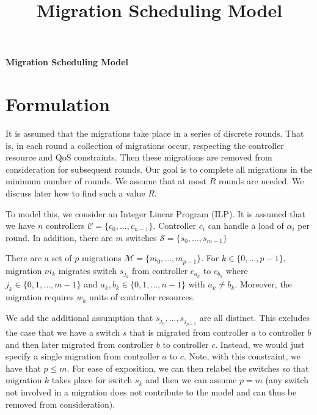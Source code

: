 \documentclass[letterpaper,12pt,titlepage,oneside,final]{article}
\title{Migration Scheduling Model}
\let\oldcenter\center
\let\oldendcenter\endcenter
\renewenvironment{center}{\setlength\topsep{0pt}\oldcenter}{\oldendcenter}
\begin{document}
\pagestyle{empty}


\pagestyle{plain}

\newpage %

\cleardoublepage

\newpage

\begin{center}
    \Huge{\bf Migration Scheduling Model}
\end{center}

\section{Formulation}

\noindent It is assumed that the migrations take place in a series of discrete rounds. That is, in each round a collection of migrations occur, respecting the controller resource and QoS constraints. Then these migrations are removed from consideration for subsequent rounds. Our goal is to complete all migrations in the minimum number of rounds. We assume that at most $R$ rounds are needed. We discuss later how to find such a value $R$.

To model this, we consider an Integer Linear Program (ILP). It is assumed that we have $n$ controllers $\mathcal{C} = \{c_{0}, ..., c_{n-1}\}$. Controller $c_{i}$ can handle a load of $\alpha_{i}$ per round. In addition, there are $m$ switches $\mathcal{S} = \{s_{0}, ..., s_{m-1}\}$

There are a set of $p$ migrations $\mathcal{M} = \{m_{0}, ..., m_{p-1}\}$. For $k \in \{0, ..., p-1\}$, migration $m_{k}$ migrates switch $s_{j_{k}}$ from controller $c_{a_{k}}$ to $c_{b_{k}}$ where $j_{k} \in \{0, 1, ..., m - 1\}$ and $a_{k}, b_{k} \in \{0, 1, ..., n - 1\}$ with $a_{k} \neq b_{k}$. Moreover, the migration requires $w_{k}$ units of controller resources. 

We add the additional assumption that $s_{j_{0}}, ..., s_{j_{p-1}}$ are all distinct. This excludes the case that we have a switch $s$ that is migrated from controller $a$ to controller $b$ and then later migrated from controller $b$ to controller $c$. Instead, we would just specify a single migration from controller $a$ to $c$. Note, with this constraint, we have that $p \leq m$. For ease of exposition, we can then relabel the switches so that migration $k$ takes place for switch $s_{k}$ and then we can assume $p = m$ (any switch not involved in a migration does not contribute to the model and can thus be removed from consideration).
\end{document}
